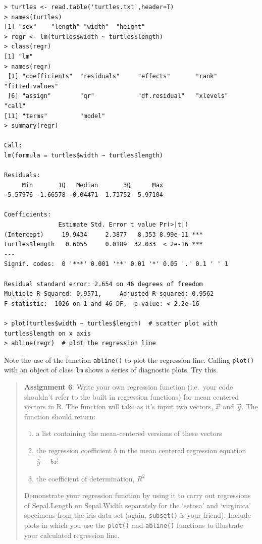 \documentclass{article}
\begin{document}
\begin{lstlisting}
> turtles <- read.table('turtles.txt',header=T)
> names(turtles)
[1] "sex"    "length" "width"  "height"
> regr <- lm(turtles$width ~ turtles$length)
> class(regr)
[1] "lm"
> names(regr)
 [1] "coefficients"  "residuals"     "effects"       "rank"          "fitted.values"
 [6] "assign"        "qr"            "df.residual"   "xlevels"       "call"         
[11] "terms"         "model"   
> summary(regr)

Call:
lm(formula = turtles$width ~ turtles$length)

Residuals:
     Min       1Q   Median       3Q      Max 
-5.57976 -1.66578 -0.04471  1.73752  5.97104 

Coefficients:
               Estimate Std. Error t value Pr(>|t|)    
(Intercept)     19.9434     2.3877   8.353 8.99e-11 ***
turtles$length   0.6055     0.0189  32.033  < 2e-16 ***
---
Signif. codes:  0 '***' 0.001 '**' 0.01 '*' 0.05 '.' 0.1 ' ' 1 

Residual standard error: 2.654 on 46 degrees of freedom
Multiple R-Squared: 0.9571,     Adjusted R-squared: 0.9562 
F-statistic:  1026 on 1 and 46 DF,  p-value: < 2.2e-16 

> plot(turtles$width ~ turtles$length)  # scatter plot with turtles$length on x axis
> abline(regr)  # plot the regression line
\end{lstlisting}
Note the use of the function \lstinline!abline()! to plot the regression
line. Calling \lstinline!plot()! with an object of class \lstinline!lm!
shows a series of diagnostic plots. Try this.

\begin{quote}
\textbf{Assignment 6}: Write your own regression function (i.e.~your
code shouldn't refer to the built in regression functions) for mean
centered vectors in R. The function will take as it's input two vectors,
$\vec{x}$ and $\vec{y}$. The function should return:

\begin{enumerate}[1.]
\item
  a list containing the mean-centered versions of these vectors
\item
  the regression coefficient $b$ in the mean centered regression
  equation $\vec{\widehat{y}} = b\vec{x}$
\item
  the coefficient of determination, $R^2$
\end{enumerate}
Demonstrate your regression function by using it to carry out
regressions of Sepal.Length on Sepal.Width separately for the `setosa'
and `virginica' specimens from the iris data set (again,
\lstinline!subset()! is your friend). Include plots in which you use the
\lstinline!plot()! and \lstinline!abline()! functions to illustrate your
calculated regression line.

\end{quote}
\end{document}
